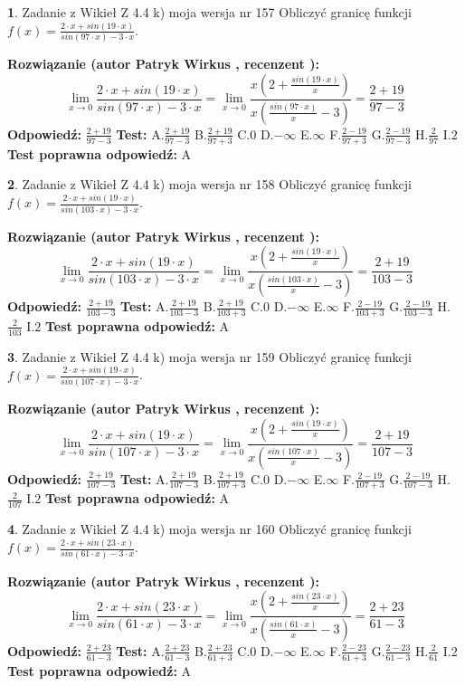 \documentclass[12pt, a4paper]{article}
\theoremstyle{definition} %
\newtheorem{zad}{}
\newcommand{\zadStart}[1]{\begin{zad}#1\newline}
\newcommand{\zadStop}{\end{zad}}
\newcommand{\rozwStart}[2]{\noindent \textbf{Rozwiązanie (autor #1 , recenzent #2): }\newline}
\newcommand{\rozwStop}{\newline}
\newcommand{\odpStart}{\noindent \textbf{Odpowiedź:}\newline}
\newcommand{\odpStop}{\newline}
\newcommand{\testStart}{\noindent \textbf{Test:}\newline}
\newcommand{\testStop}{\newline}
\newcommand{\kluczStart}{\noindent \textbf{Test poprawna odpowiedź:}\newline}
\newcommand{\kluczStop}{\newline}
\begin{document}
\zadStart{Zadanie z Wikieł Z 4.4 k) moja wersja nr 157}
Obliczyć granicę funkcji $f(x)=\frac{2\cdot x +sin(19\cdot x)}{sin(97\cdot x) -3\cdot x}$.
\zadStop
\rozwStart{Patryk Wirkus}{}
$$\lim\limits_{x\to 0}\frac{2\cdot x +sin(19\cdot x)}{sin(97\cdot x) -3\cdot x}
=\lim\limits_{x\to 0}\frac{x(2+\frac{sin(19\cdot x)}{x})}{x(\frac{sin(97\cdot x)}{x}-3)}
=\frac{2+19}{97-3}$$
\rozwStop
\odpStart
$\frac{2+19}{97-3}$
\odpStop
\testStart
A.$\frac{2+19}{97-3}$
B.$\frac{2+19}{97+3}$
C.$0$
D.$-\infty$
E.$\infty$
F.$\frac{2-19}{97+3}$
G.$\frac{2-19}{97-3}$
H.$\frac{2}{97}$
I.$2$
\testStop
\kluczStart
A
\kluczStop



\zadStart{Zadanie z Wikieł Z 4.4 k) moja wersja nr 158}
Obliczyć granicę funkcji $f(x)=\frac{2\cdot x +sin(19\cdot x)}{sin(103\cdot x) -3\cdot x}$.
\zadStop
\rozwStart{Patryk Wirkus}{}
$$\lim\limits_{x\to 0}\frac{2\cdot x +sin(19\cdot x)}{sin(103\cdot x) -3\cdot x}
=\lim\limits_{x\to 0}\frac{x(2+\frac{sin(19\cdot x)}{x})}{x(\frac{sin(103\cdot x)}{x}-3)}
=\frac{2+19}{103-3}$$
\rozwStop
\odpStart
$\frac{2+19}{103-3}$
\odpStop
\testStart
A.$\frac{2+19}{103-3}$
B.$\frac{2+19}{103+3}$
C.$0$
D.$-\infty$
E.$\infty$
F.$\frac{2-19}{103+3}$
G.$\frac{2-19}{103-3}$
H.$\frac{2}{103}$
I.$2$
\testStop
\kluczStart
A
\kluczStop



\zadStart{Zadanie z Wikieł Z 4.4 k) moja wersja nr 159}
Obliczyć granicę funkcji $f(x)=\frac{2\cdot x +sin(19\cdot x)}{sin(107\cdot x) -3\cdot x}$.
\zadStop
\rozwStart{Patryk Wirkus}{}
$$\lim\limits_{x\to 0}\frac{2\cdot x +sin(19\cdot x)}{sin(107\cdot x) -3\cdot x}
=\lim\limits_{x\to 0}\frac{x(2+\frac{sin(19\cdot x)}{x})}{x(\frac{sin(107\cdot x)}{x}-3)}
=\frac{2+19}{107-3}$$
\rozwStop
\odpStart
$\frac{2+19}{107-3}$
\odpStop
\testStart
A.$\frac{2+19}{107-3}$
B.$\frac{2+19}{107+3}$
C.$0$
D.$-\infty$
E.$\infty$
F.$\frac{2-19}{107+3}$
G.$\frac{2-19}{107-3}$
H.$\frac{2}{107}$
I.$2$
\testStop
\kluczStart
A
\kluczStop



\zadStart{Zadanie z Wikieł Z 4.4 k) moja wersja nr 160}
Obliczyć granicę funkcji $f(x)=\frac{2\cdot x +sin(23\cdot x)}{sin(61\cdot x) -3\cdot x}$.
\zadStop
\rozwStart{Patryk Wirkus}{}
$$\lim\limits_{x\to 0}\frac{2\cdot x +sin(23\cdot x)}{sin(61\cdot x) -3\cdot x}
=\lim\limits_{x\to 0}\frac{x(2+\frac{sin(23\cdot x)}{x})}{x(\frac{sin(61\cdot x)}{x}-3)}
=\frac{2+23}{61-3}$$
\rozwStop
\odpStart
$\frac{2+23}{61-3}$
\odpStop
\testStart
A.$\frac{2+23}{61-3}$
B.$\frac{2+23}{61+3}$
C.$0$
D.$-\infty$
E.$\infty$
F.$\frac{2-23}{61+3}$
G.$\frac{2-23}{61-3}$
H.$\frac{2}{61}$
I.$2$
\testStop
\kluczStart
A
\kluczStop
\end{document}
